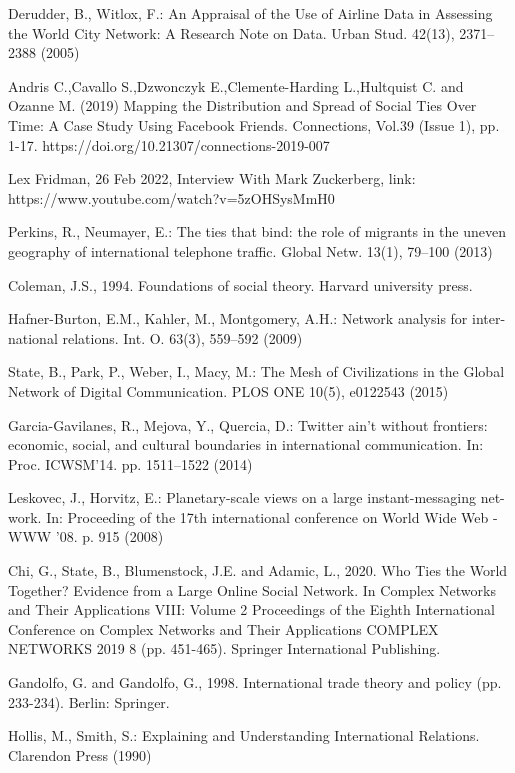 \documentclass[12pt]{article}
\begin{document}
Derudder, B., Witlox, F.: An Appraisal of the Use of Airline Data in Assessing the
World City Network: A Research Note on Data. Urban Stud. 42(13), 2371–2388
(2005)

Andris C.,Cavallo S.,Dzwonczyk E.,Clemente-Harding L.,Hultquist C. and Ozanne M. (2019) Mapping the Distribution and Spread of Social Ties Over Time: A Case Study Using Facebook Friends. Connections, Vol.39 (Issue 1), pp. 1-17. https://doi.org/10.21307/connections-2019-007

Lex Fridman, 26 Feb 2022, Interview With Mark Zuckerberg, link: https://www.youtube.com/watch?v=5zOHSysMmH0

Perkins, R., Neumayer, E.: The ties that bind: the role of migrants in the uneven
geography of international telephone traffic. Global Netw. 13(1), 79–100 (2013)

Coleman, J.S., 1994. Foundations of social theory. Harvard university press.

Hafner-Burton, E.M., Kahler, M., Montgomery, A.H.: Network analysis for inter-
national relations. Int. O. 63(3), 559–592 (2009)

State, B., Park, P., Weber, I., Macy, M.: The Mesh of Civilizations in the Global
Network of Digital Communication. PLOS ONE 10(5), e0122543 (2015)

Garcia-Gavilanes, R., Mejova, Y., Quercia, D.: Twitter ain’t without frontiers:
economic, social, and cultural boundaries in international communication. In: Proc.
ICWSM’14. pp. 1511–1522 (2014)

Leskovec, J., Horvitz, E.: Planetary-scale views on a large instant-messaging net-
work. In: Proceeding of the 17th international conference on World Wide Web -
WWW ’08. p. 915 (2008)

Chi, G., State, B., Blumenstock, J.E. and Adamic, L., 2020. Who Ties the World Together? Evidence from a Large Online Social Network. In Complex Networks and Their Applications VIII: Volume 2 Proceedings of the Eighth International Conference on Complex Networks and Their Applications COMPLEX NETWORKS 2019 8 (pp. 451-465). Springer International Publishing.

Gandolfo, G. and Gandolfo, G., 1998. International trade theory and policy (pp. 233-234). Berlin: Springer.

Hollis, M., Smith, S.: Explaining and Understanding International Relations.
Clarendon Press (1990)
\end{document}
